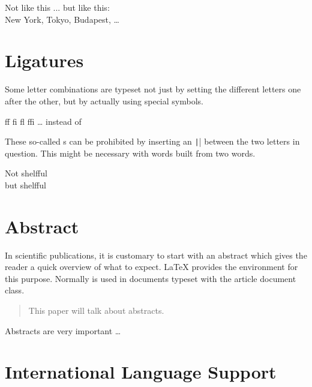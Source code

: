 \begin{chktexignore}
  \begin{example}
Not like this ...
but like this:\\
New York, Tokyo,
Budapest, \ldots
\end{example}
\end{chktexignore}

\section{Ligatures}

Some letter combinations are typeset not just by setting the
different letters one after the other, but by actually using special
symbols.
\begin{code}
{\large ff fi fl ffi \ldots}\quad
instead of
\end{code}
These so-called s can be prohibited by inserting an \texttt|\mbox{}|
between the two letters in question. This might be necessary with
words built from two words.

\begin{example}
\Large %
Not shelfful\\
but shelf\mbox{}ful
\end{example}

\section{Abstract}

In scientific publications, it is customary to start with an abstract which
gives the reader a quick overview of what to expect. \LaTeX{} provides the
 environment for this purpose. Normally  is used
in documents typeset with the article document class.

\begin{example}[standalone, paperheight=3.5cm]
\begin{abstract}
  This paper will talk about
  abstracts.
\end{abstract}

Abstracts are very important \ldots
\end{example}

\section{International Language Support}\label{sec:polyglossia}%

